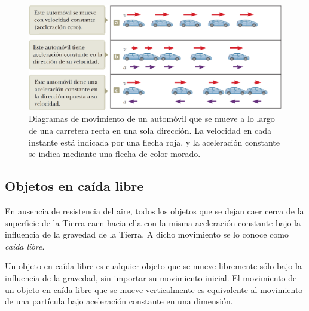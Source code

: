     \begin{figure}[H]
      \centering
      \includegraphics[scale=0.4]{1/graphics_2/figure_2}
      \caption{Diagramas de movimiento de un automóvil que se mueve a lo largo de una carretera recta en una sola
      dirección. La velocidad en cada instante está indicada por una flecha roja, y la aceleración constante se indica
      mediante una flecha de color morado.}
    \end{figure}

  \subsection{Objetos en caída libre}
    \PN En ausencia de resistencia del aire, todos los objetos que se dejan caer cerca de la superficie de la Tierra
    caen hacia ella con la misma aceleración constante bajo la influencia de la gravedad de la Tierra. A dicho
    movimiento se lo conoce como \textit{caída libre}.

    \PN Un objeto en caída libre es cualquier objeto que se mueve libremente sólo bajo la influencia de la gravedad, sin
    importar su movimiento inicial. El movimiento de un objeto en caída libre que se mueve verticalmente es equivalente
    al movimiento de una partícula bajo aceleración constante en una dimensión.
